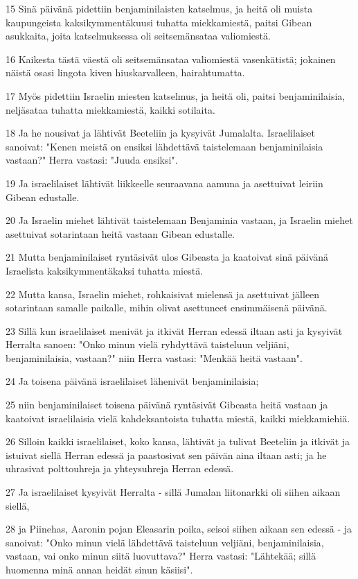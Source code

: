 \par 15 Sinä päivänä pidettiin benjaminilaisten katselmus, ja heitä oli muista kaupungeista kaksikymmentäkuusi tuhatta miekkamiestä, paitsi Gibean asukkaita, joita katselmuksessa oli seitsemänsataa valiomiestä.
\par 16 Kaikesta tästä väestä oli seitsemänsataa valiomiestä vasenkätistä; jokainen näistä osasi lingota kiven hiuskarvalleen, hairahtumatta.
\par 17 Myös pidettiin Israelin miesten katselmus, ja heitä oli, paitsi benjaminilaisia, neljäsataa tuhatta miekkamiestä, kaikki sotilaita.
\par 18 Ja he nousivat ja lähtivät Beeteliin ja kysyivät Jumalalta. Israelilaiset sanoivat: "Kenen meistä on ensiksi lähdettävä taistelemaan benjaminilaisia vastaan?" Herra vastasi: "Juuda ensiksi".
\par 19 Ja israelilaiset lähtivät liikkeelle seuraavana aamuna ja asettuivat leiriin Gibean edustalle.
\par 20 Ja Israelin miehet lähtivät taistelemaan Benjaminia vastaan, ja Israelin miehet asettuivat sotarintaan heitä vastaan Gibean edustalle.
\par 21 Mutta benjaminilaiset ryntäsivät ulos Gibeasta ja kaatoivat sinä päivänä Israelista kaksikymmentäkaksi tuhatta miestä.
\par 22 Mutta kansa, Israelin miehet, rohkaisivat mielensä ja asettuivat jälleen sotarintaan samalle paikalle, mihin olivat asettuneet ensimmäisenä päivänä.
\par 23 Sillä kun israelilaiset menivät ja itkivät Herran edessä iltaan asti ja kysyivät Herralta sanoen: "Onko minun vielä ryhdyttävä taisteluun veljiäni, benjaminilaisia, vastaan?" niin Herra vastasi: "Menkää heitä vastaan".
\par 24 Ja toisena päivänä israelilaiset lähenivät benjaminilaisia;
\par 25 niin benjaminilaiset toisena päivänä ryntäsivät Gibeasta heitä vastaan ja kaatoivat israelilaisia vielä kahdeksantoista tuhatta miestä, kaikki miekkamiehiä.
\par 26 Silloin kaikki israelilaiset, koko kansa, lähtivät ja tulivat Beeteliin ja itkivät ja istuivat siellä Herran edessä ja paastosivat sen päivän aina iltaan asti; ja he uhrasivat polttouhreja ja yhteysuhreja Herran edessä.
\par 27 Ja israelilaiset kysyivät Herralta - sillä Jumalan liitonarkki oli siihen aikaan siellä,
\par 28 ja Piinehas, Aaronin pojan Eleasarin poika, seisoi siihen aikaan sen edessä - ja sanoivat: "Onko minun vielä lähdettävä taisteluun veljiäni, benjaminilaisia, vastaan, vai onko minun siitä luovuttava?" Herra vastasi: "Lähtekää; sillä huomenna minä annan heidät sinun käsiisi".

